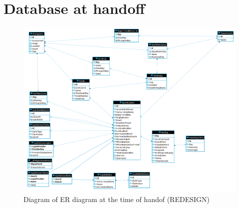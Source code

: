 \section{Database at handoff}\label{app:state-at-handoff:db}

\begin{figure}[h]
    \centering
    \caption{Diagram of ER diagram at the time of handof (REDESIGN)}
    \includegraphics[width=1\textwidth]{figures/db_ho.png}
\end{figure}